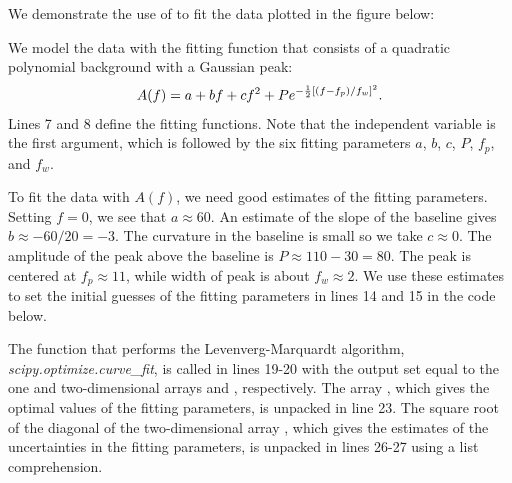 \documentclass[letterpaper,10pt,english]{sphinxmanual}
\begin{document}
We demonstrate the use of  to fit the data plotted in the figure below:
\begin{figure}[htbp]
\centering

\label{chap8/chap8_fitting:fig-spectrum}\end{figure}

We model the data with the fitting function that consists of a quadratic polynomial background with a Gaussian peak:
\begin{gather}
\begin{split}A(f) = a + bf + cf^2 + P e^{-\frac{1}{2}[(f-f_p)/f_w]^2} .\end{split}\notag
\end{gather}
Lines 7 and 8 define the fitting functions.  Note that the independent variable  is the first argument, which is followed by the six fitting parameters $a$, $b$, $c$, $P$, $f_p$, and $f_w$.

To fit the data with $A(f)$, we need good estimates of the fitting parameters.  Setting $f=0$, we see that $a \approx 60$.  An estimate of the slope of the baseline gives $b \approx -60/20=-3$.  The curvature in the baseline is small so we take $c \approx 0$.  The amplitude of the peak above the baseline is $P \approx 110-30=80$.  The peak is centered at $f_p \approx 11$, while width of peak is about $f_w \approx 2$.  We use these estimates to set the initial guesses of the fitting parameters in lines 14 and 15 in the code below.

The function that performs the Levenverg-Marquardt algorithm, \emph{scipy.optimize.curve\_fit}, is called in lines 19-20 with the output set equal to the one and two-dimensional arrays  and , respectively.  The array , which gives the optimal values of the  fitting parameters, is unpacked in line 23.  The square root of the diagonal of the two-dimensional array , which gives the estimates of the uncertainties in the fitting parameters, is unpacked in lines 26-27 using a list comprehension.
\end{document}
